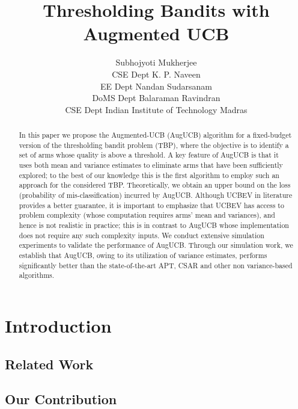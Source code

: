 \documentclass{article}
\title{Thresholding Bandits with Augmented UCB}
\author{Subhojyoti Mukherjee \\ CSE Dept \And K. P. Naveen \\ EE Dept \And Nandan Sudarsanam \\ DoMS Dept \And Balaraman Ravindran \\ CSE Dept \AND Indian Institute of Technology Madras}
\begin{document}
\maketitle

\vspace*{2mm}
\begin{abstract}
In this paper we propose the Augmented-UCB (AugUCB) algorithm for a fixed-budget version of the thresholding bandit problem (TBP), where the objective is to identify a set of arms whose quality is above a threshold. A key feature of AugUCB is that it uses both mean and variance estimates to eliminate arms that have been sufficiently explored; to the best of our knowledge this is the first algorithm to employ such an approach for the considered TBP.  Theoretically, we obtain an upper bound on the loss (probability of mis-classification) incurred by AugUCB. Although UCBEV in literature provides a better guarantee, it is important to emphasize that UCBEV has access to problem complexity (whose computation requires arms' mean and variances), and hence is not realistic in practice; this is in contrast to AugUCB whose implementation does not require any such complexity inputs. We conduct extensive simulation experiments to validate the performance of AugUCB. Through our simulation work, we establish that AugUCB, owing to its utilization of variance estimates, performs significantly better than the state-of-the-art APT, CSAR and other non variance-based algorithms.
\end{abstract}


\section{Introduction}
\label{intro}


\subsection{Related Work}
\label{prevRes}


\subsection{Our Contribution}
\label{contribution}

%
%
%
%
\vspace*{-1em}
\end{document}
